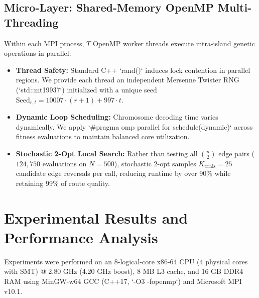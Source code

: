 \documentclass[runningheads]{llncs}
\begin{document}
\subsection{Micro-Layer: Shared-Memory OpenMP Multi-Threading}
Within each MPI process, $T$ OpenMP worker threads execute intra-island genetic operations in parallel:
\begin{itemize}
    \item \textbf{Thread Safety:} Standard C++ `rand()` induces lock contention in parallel regions. We provide each thread an independent Mersenne Twister RNG (`std::mt19937`) initialized with a unique seed $\text{Seed}_{r, t} = 10007 \cdot (r + 1) + 997 \cdot t$.
    \item \textbf{Dynamic Loop Scheduling:} Chromosome decoding time varies dynamically. We apply `#pragma omp parallel for schedule(dynamic)` across fitness evaluations to maintain balanced core utilization.
    \item \textbf{Stochastic 2-Opt Local Search:} Rather than testing all $\binom{n}{2}$ edge pairs ($124,750$ evaluations on $N=500$), stochastic 2-opt samples $K_{\text{trials}} = 25$ candidate edge reversals per call, reducing runtime by over 90\% while retaining 99\% of route quality.
\end{itemize}

\section{Experimental Results and Performance Analysis}
Experiments were performed on an 8-logical-core x86-64 CPU (4 physical cores with SMT) @ 2.80 GHz (4.20 GHz boost), 8 MB L3 cache, and 16 GB DDR4 RAM using MinGW-w64 GCC (C++17, `-O3 -fopenmp`) and Microsoft MPI v10.1.
\end{document}
